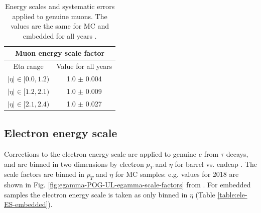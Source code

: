 \begin{table}[ht]
    \centering
    \begin{tabular}{|c|c|}
    \hline
    \multicolumn{2}{|c|}{Muon energy scale factor}      \\ \hline
    \hline
    Eta range                & Value for all years \\ \hline
    $|\eta| \in [0.0, 1.2)$  & 1.0 $\pm$ 0.004 \\
    $|\eta| \in [1.2, 2.1)$  & 1.0 $\pm$ 0.009 \\
    $|\eta| \in [2.1, 2.4)$  & 1.0 $\pm$ 0.027 \\
    \hline
    \end{tabular}
    \caption[Energy scales and systematic errors applied to genuine muons.]{Energy scales and systematic errors applied to genuine muons. The values are the same for MC and embedded for all years \cite{twiki_HiggsToTauTauWorkingLegacyRun2} \cite{twiki_MUO_simplified_ES}.}
    \label{table:muon-ES}
\end{table}


\subsection{Electron energy scale}
\label{sec:electron_energy_scale}

Corrections to the electron energy scale are applied to genuine $e$ from $\tau$ decays, and are binned in two dimensions by electron $p_{T}$ and $\eta$ for barrel vs. endcap \cite{twiki_Electron_POG_recommendation}. The scale factors are binned in $p_{T}$ and $\eta$ for MC samples: e.g. values for 2018 are shown in Fig. \ref{fig:egamma-POG-UL-egamma-scale-factors} from \cite{twiki_Electron_UL_2016_2017_2018}. For embedded samples the electron energy scale is taken as only binned in $\eta$ (Table \ref{table:ele-ES-embedded}).

